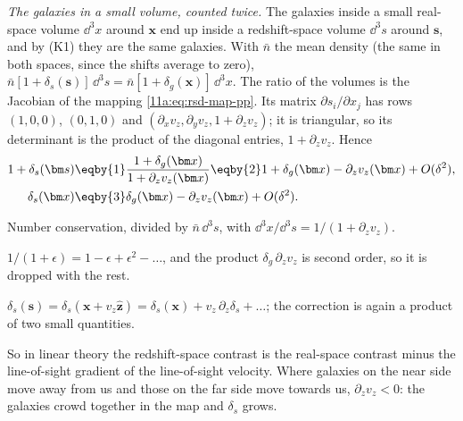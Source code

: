\emph{The galaxies in a small volume, counted twice.} The galaxies inside a small
real-space volume $\dd^3x$ around $\bm x$ end up inside a redshift-space volume
$\dd^3s$ around $\bm s$, and by (K1) they are the same galaxies. With $\bar n$ the
mean density (the same in both spaces, since the shifts average to zero),
$\bar n[1+\delta_s(\bm s)]\,\dd^3s=\bar n[1+\delta_g(\bm x)]\,\dd^3x$. The ratio of
the volumes is the Jacobian of the mapping \eqref{11a:eq:rsd-map-pp}. Its matrix
$\partial s_i/\partial x_j$ has rows $(1,0,0)$, $(0,1,0)$ and
$(\partial_xv_z,\partial_yv_z,1+\partial_zv_z)$; it is triangular, so its
determinant is the product of the diagonal entries, $1+\partial_zv_z$. Hence
\begin{align}
  1+\delta_s(\bm s)
  &\eqby{1}\frac{1+\delta_g(\bm x)}{1+\partial_zv_z(\bm x)}
   \eqby{2}1+\delta_g(\bm x)-\partial_zv_z(\bm x)+O(\delta^2),
  \nonumber\\
  \delta_s(\bm x)
  &\eqby{3}\delta_g(\bm x)-\partial_zv_z(\bm x)+O(\delta^2).
  \label{11a:eq:rsd-jacobian}
\end{align}
\begin{explain}
  \item Number conservation, divided by $\bar n\,\dd^3s$, with
        $\dd^3x/\dd^3s=1/(1+\partial_zv_z)$.
  \item $1/(1+\epsilon)=1-\epsilon+\epsilon^2-\dots$, and the product
        $\delta_g\,\partial_zv_z$ is second order, so it is dropped with the rest.
  \item $\delta_s(\bm s)=\delta_s(\bm x+v_z\hat{\bm z})
        =\delta_s(\bm x)+v_z\,\partial_z\delta_s+\dots$; the correction is again a
        product of two small quantities.
\end{explain}
So in linear theory the redshift-space contrast is the real-space contrast minus
the line-of-sight gradient of the line-of-sight velocity. Where galaxies on the
near side move away from us and those on the far side move towards us,
$\partial_zv_z<0$: the galaxies crowd together in the map and $\delta_s$ grows.

